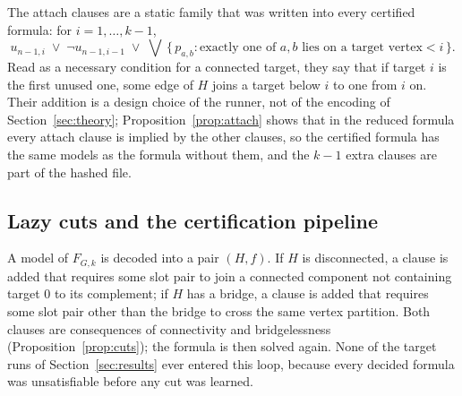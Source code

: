 \documentclass[11pt]{article}
\theoremstyle{definition}
\theoremstyle{remark}
\begin{document}
The attach clauses are a static family that was written into every certified formula: for $i = 1, \dots, k-1$,
\begin{equation}\label{eq:attach}
u_{n-1,i} \;\vee\; \neg u_{n-1,i-1} \;\vee\; \bigvee\,\{\,p_{a,b} : \text{exactly one of } a, b \text{ lies on a target vertex} < i\,\}.
\end{equation}
Read as a necessary condition for a connected target, they say that if target $i$ is the first unused one, some edge of $H$ joins a target below $i$ to one from $i$ on. Their addition is a
design choice of the runner, not of the encoding of Section~\ref{sec:theory}; Proposition~\ref{prop:attach} shows that in the reduced formula every attach clause is
implied by the other clauses, so the certified formula has the same models as the formula without them, and the $k-1$ extra clauses are part of the hashed file.

\subsection{Lazy cuts and the certification pipeline}\label{sec:pipeline}

A model of $F_{G,k}$ is decoded into a pair $(H,f)$. If $H$ is disconnected, a clause is added that requires some slot pair to join a connected component not containing target 0
to its complement; if $H$ has a bridge, a clause is added that requires some slot pair other than the bridge to cross the same vertex partition. Both clauses are consequences of
connectivity and bridgelessness (Proposition~\ref{prop:cuts}); the formula is then solved again. None of the target runs of Section~\ref{sec:results} ever entered this loop, because every
decided formula was unsatisfiable before any cut was learned.
\end{document}
